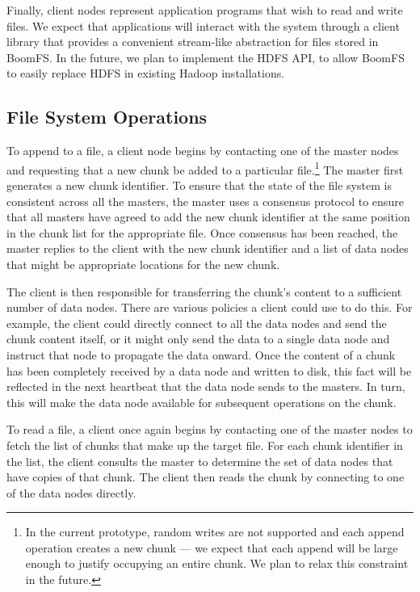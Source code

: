 \documentclass[twocolumn]{article}
\begin{document}
Finally, client nodes represent application programs that wish to read
and write files. We expect that applications will interact with the
system through a client library that provides a convenient stream-like
abstraction for files stored in BoomFS. In the future, we plan to
implement the HDFS API, to allow BoomFS to easily replace HDFS in
existing Hadoop installations.

\subsection{File System Operations}
\label{fs-ops}
To append to a file, a client node begins by contacting one of the
master nodes and requesting that a new chunk be added to a particular
file.\footnote{In the current prototype, random writes are not
  supported and each append operation creates a new chunk --- we
  expect that each append will be large enough to justify occupying an
  entire chunk. We plan to relax this constraint in the future.} The
master first generates a new chunk identifier. To ensure that the
state of the file system is consistent across all the masters, the
master uses a consensus protocol to ensure that all masters have
agreed to add the new chunk identifier at the same position in the
chunk list for the appropriate file. Once consensus has been reached,
the master replies to the client with the new chunk identifier and a
list of data nodes that might be appropriate locations for the new
chunk.

The client is then responsible for transferring the chunk's content to
a sufficient number of data nodes. There are various policies a client
could use to do this. For example, the client could directly connect
to all the data nodes and send the chunk content itself, or it might
only send the data to a single data node and instruct that node to
propagate the data onward. Once the content of a chunk has been
completely received by a data node and written to disk, this fact will
be reflected in the next heartbeat that the data node sends to the
masters. In turn, this will make the data node available for
subsequent operations on the chunk.

To read a file, a client once again begins by contacting one of the
master nodes to fetch the list of chunks that make up the target
file. For each chunk identifier in the list, the client consults the
master to determine the set of data nodes that have copies of that
chunk. The client then reads the chunk by connecting to one of the
data nodes directly.
\end{document}
